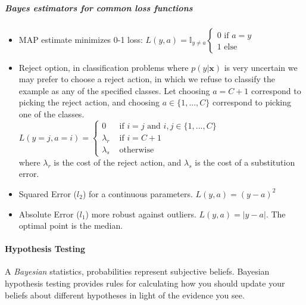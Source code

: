 \subparagraph{Bayes estimators for common loss functions}
\begin{itemize}
	\item MAP estimate minimizes 0-1 loss: $L(y, a) = \mathbb{I}_{y\neq a}
		\begin{cases}
			0 \text{ if } a = y\\
			1 \text{ else}
		\end{cases}$
	\item Reject option, in classification problems where $p(y|\bm{x})$ is very 
		uncertain we may prefer to choose a reject action, in which we refuse to 
		classify the example as any of the specified classes. Let choosing $a=C+1$
		correspond to picking the reject action, and choosing $a\in\{1,...,C\}$
		correspond to picking one of the classes.\\
		$L(y=j, a=i) = 
		\begin{cases}
			0 &\text{ if } i=j \text{ and } i,j\in\{1,...,C\}\\
			\lambda_{r} &\text{ if } i=C+1 \\
			\lambda_{s} &\text{ otherwise}
		\end{cases} $\\
		where $\lambda_{r}$ is the cost of the reject action, and $\lambda_{s}$ is
		the cost of a substitution error. 
	\item Squared Error ($l_{2}$) for a continuous parameters. $L(y, a) = (y-a)^{2}$
	\item Absolute Error ($l_{1}$) more robust against outliers. $L(y,a)=
		\lvert y-a\rvert$. The optimal point is the median.

\end{itemize}



\paragraph{Hypothesis Testing}
A \emph{Bayesian} statistics, probabilities represent subjective beliefs. 
Bayesian hypothesis testing provides rules for calculating how you should update your 
beliefs about different hypotheses in light of the evidence you see.\\


